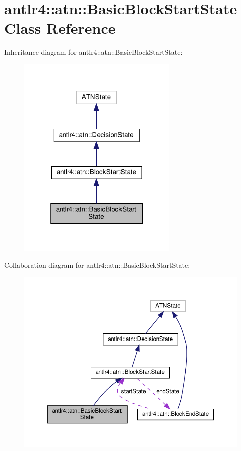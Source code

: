\hypertarget{classantlr4_1_1atn_1_1BasicBlockStartState}{}\section{antlr4\+:\+:atn\+:\+:Basic\+Block\+Start\+State Class Reference}
\label{classantlr4_1_1atn_1_1BasicBlockStartState}


Inheritance diagram for antlr4\+:\+:atn\+:\+:Basic\+Block\+Start\+State\+:
\nopagebreak
\begin{figure}[H]
\begin{center}
\leavevmode
\includegraphics[width=217pt]{classantlr4_1_1atn_1_1BasicBlockStartState__inherit__graph}
\end{center}
\end{figure}


Collaboration diagram for antlr4\+:\+:atn\+:\+:Basic\+Block\+Start\+State\+:
\nopagebreak
\begin{figure}[H]
\begin{center}
\leavevmode
\includegraphics[width=350pt]{classantlr4_1_1atn_1_1BasicBlockStartState__coll__graph}
\end{center}
\end{figure}
